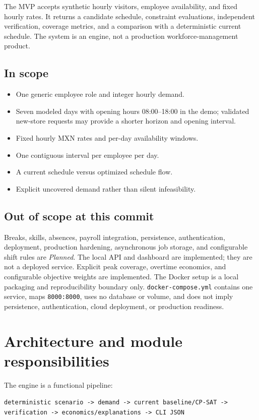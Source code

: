 \documentclass[11pt,a4paper]{article}
\newcommand{\planned}{\textit{Planned}}
\begin{document}
The MVP accepts synthetic hourly visitors, employee availability, and fixed hourly rates. It returns a candidate schedule, constraint evaluations, independent verification, coverage metrics, and a comparison with a deterministic current schedule. The system is an engine, not a production workforce-management product.

\subsection{In scope}
\begin{itemize}
  \item One generic employee role and integer hourly demand.
  \item Seven modeled days with opening hours 08:00--18:00 in the demo; validated new-store requests may provide a shorter horizon and opening interval.
  \item Fixed hourly MXN rates and per-day availability windows.
  \item One contiguous interval per employee per day.
  \item A current schedule versus optimized schedule flow.
  \item Explicit uncovered demand rather than silent infeasibility.
\end{itemize}

\subsection{Out of scope at this commit}
Breaks, skills, absences, payroll integration, persistence, authentication, deployment, production hardening, asynchronous job storage, and configurable shift rules are \planned. The local API and dashboard are implemented; they are not a deployed service. Explicit peak coverage, overtime economics, and configurable objective weights are implemented.
The Docker setup is a local packaging and reproducibility boundary only. \texttt{docker-compose.yml} contains one service, maps \texttt{8000:8000}, uses no database or volume, and does not imply persistence, authentication, cloud deployment, or production readiness.

\section{Architecture and module responsibilities}
The engine is a functional pipeline:
\begin{center}
\texttt{deterministic scenario -> demand -> current baseline/CP-SAT -> verification -> economics/explanations -> CLI JSON}
\end{center}
\end{document}
